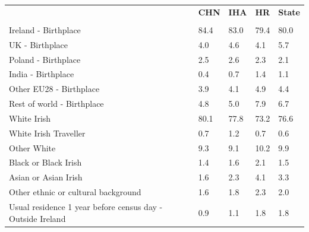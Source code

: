 \documentclass{article}
\begin{document}
\pagebreak
\begin{table}[h]	
\centering
		\begin{tabular}{KTTTT}
  \hline
& \textbf{CHN} & \textbf{IHA} & \textbf{HR}& \textbf{State}\\ 
  \hline
    \\ 
    \hline
Ireland - Birthplace & 84.4& 83.0& 79.4& 80.0\\
UK - Birthplace & 4.0& 4.6& 4.1& 5.7\\
Poland - Birthplace & 2.5& 2.6& 2.3& 2.1\\
India - Birthplace & 0.4& 0.7& 1.4& 1.1\\
Other EU28 - Birthplace & 3.9& 4.1& 4.9& 4.4\\
Rest of world - Birthplace & 4.8& 5.0& 7.9& 6.7\\
    \hline
White Irish & 80.1& 77.8& 73.2& 76.6\\
White Irish Traveller & 0.7& 1.2& 0.7& 0.6\\
Other White &  9.3&  9.1& 10.2&  9.9\\
Black or Black Irish & 1.4& 1.6& 2.1& 1.5\\
Asian or Asian Irish & 1.6& 2.3& 4.1& 3.3\\
Other ethnic or cultural background & 1.6& 1.8& 2.3& 2.0\\
    \hline
Usual residence 1 year before census day - Outside Ireland & 0.9& 1.1& 1.8& 1.8\\


\end{tabular}
\end{table}
\end{document}
